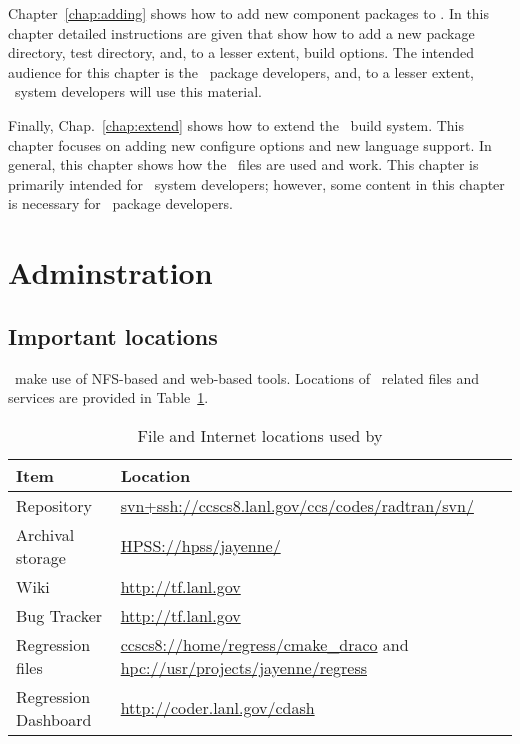 Chapter~\ref{chap:adding} shows how to add new component packages to
\draco.  In this chapter detailed instructions are given that show how
to add a new package directory, test directory, and, to a lesser
extent, build options.  The intended audience for this chapter is the
\draco\ package developers, and, to a lesser extent, \draco\ system
developers will use this material.

Finally, Chap.~\ref{chap:extend} shows how to extend the \draco\ build 
system.  This chapter focuses on adding new configure options and new
language support.  %
In general, this chapter shows how the \cmake\ files are used and work.
 This chapter is primarily intended
for \draco\ system developers; however, some content in this chapter
is necessary for \draco\ package developers.

\section{Adminstration}
\label{sec:admin}

\subsection{Important locations}
\draco\ make use of NFS-based and web-based tools.  Locations of \draco\ related files and services are provided in Table~\ref{tab:important-locations}.
\begin{table}
  \begin{center}
    \caption{File and Internet locations used by \draco}
    \label{tab:important-locations}
    \begin{tabular}{lp{4in}}\hline\hline

          Item                             & Location \\ 
          \hline
          Repository & \url{svn+ssh://ccscs8.lanl.gov/ccs/codes/radtran/svn/} \\
          Archival storage & \url{HPSS://hpss/jayenne/} \\
          Wiki & \href{http://tf.lanl.gov}{http://tf.lanl.gov} \\
          Bug Tracker &  \href{http://tf.lanl.gov}{http://tf.lanl.gov} \\
          Regression files & \url{ccscs8://home/regress/cmake_draco} and \url{hpc://usr/projects/jayenne/regress} \\
          Regression Dashboard & \href{http://coder.lanl.gov/cdash}{http://coder.lanl.gov/cdash} \\
  
	\hline \hline

    \end{tabular}
  \end{center}
\end{table}

